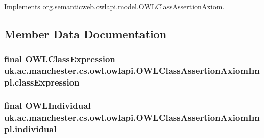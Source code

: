 Implements \hyperlink{interfaceorg_1_1semanticweb_1_1owlapi_1_1model_1_1_o_w_l_class_assertion_axiom_a61b1fe712776fa619143cb8f83c2e18d}{org.\-semanticweb.\-owlapi.\-model.\-O\-W\-L\-Class\-Assertion\-Axiom}.



\subsection{Member Data Documentation}
\hypertarget{classuk_1_1ac_1_1manchester_1_1cs_1_1owl_1_1owlapi_1_1_o_w_l_class_assertion_axiom_impl_a6a80c806c749e634253e10f0acc080ea}{
\subsubsection[{class\-Expression}]{\setlength{\rightskip}{0pt plus 5cm}final {\bf O\-W\-L\-Class\-Expression} uk.\-ac.\-manchester.\-cs.\-owl.\-owlapi.\-O\-W\-L\-Class\-Assertion\-Axiom\-Impl.\-class\-Expression\hspace{0.3cm}{\ttfamily [private]}}}\label{classuk_1_1ac_1_1manchester_1_1cs_1_1owl_1_1owlapi_1_1_o_w_l_class_assertion_axiom_impl_a6a80c806c749e634253e10f0acc080ea}
\hypertarget{classuk_1_1ac_1_1manchester_1_1cs_1_1owl_1_1owlapi_1_1_o_w_l_class_assertion_axiom_impl_a9964ce9818b14016a0e1943ca74dd249}{
\subsubsection[{individual}]{\setlength{\rightskip}{0pt plus 5cm}final {\bf O\-W\-L\-Individual} uk.\-ac.\-manchester.\-cs.\-owl.\-owlapi.\-O\-W\-L\-Class\-Assertion\-Axiom\-Impl.\-individual\hspace{0.3cm}{\ttfamily [private]}}}\label{classuk_1_1ac_1_1manchester_1_1cs_1_1owl_1_1owlapi_1_1_o_w_l_class_assertion_axiom_impl_a9964ce9818b14016a0e1943ca74dd249}
